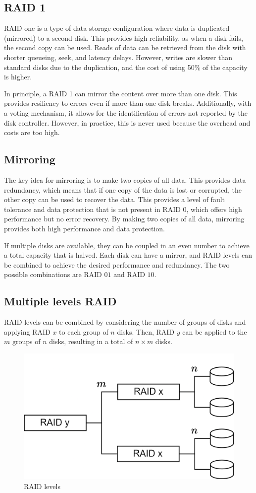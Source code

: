 \subsection{RAID 1}
RAID one is a type of data storage configuration where data is duplicated (mirrored) to a second disk. 
This provides high reliability, as when a disk fails, the second copy can be used. 
Reads of data can be retrieved from the disk with shorter queueing, seek, and latency delays.
However, writes are slower than standard disks due to the duplication, and the cost of using 50\% of the capacity is higher.

In principle, a RAID 1 can mirror the content over more than one disk. 
This provides resiliency to errors even if more than one disk breaks.
Additionally, with a voting mechanism, it allows for the identification of errors not reported by the disk controller. 
However, in practice, this is never used because the overhead and costs are too high.

\subsection{Mirroring}
The key idea for mirroring is to make two copies of all data. 
This provides data redundancy, which means that if one copy of the data is lost or corrupted, the other copy can be used to recover the data. 
This provides a level of fault tolerance and data protection that is not present in RAID 0, which offers high performance but no error recovery.
By making two copies of all data, mirroring provides both high performance and data protection.

If multiple disks are available, they can be coupled in an even number to achieve a total capacity that is halved. 
Each disk can have a mirror, and RAID levels can be combined to achieve the desired performance and redundancy. 
The two possible combinations are RAID $01$ and RAID $10$.

\subsection{Multiple levels RAID}
RAID levels can be combined by considering the number of groups of disks and applying RAID $x$ to each group of $n$ disks. 
Then, RAID $y$ can be applied to the $m$ groups of $n$ disks, resulting in a total of $n \times m$ disks.
\begin{figure}[H]
    \centering
    \includegraphics[width=0.5\linewidth]{images/level.png}
    \caption{RAID levels}
\end{figure}

